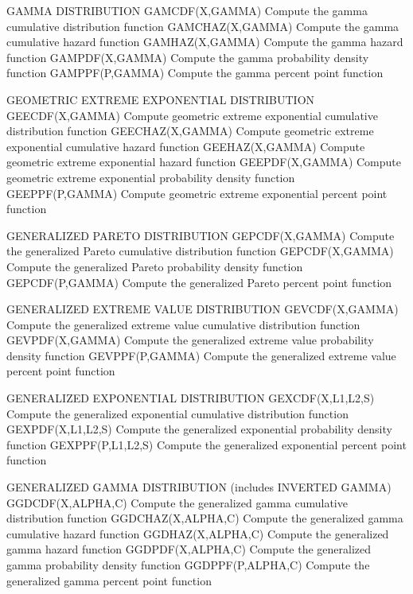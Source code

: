 GAMMA DISTRIBUTION
   GAMCDF(X,GAMMA)    Compute the gamma cumulative distribution
                      function
   GAMCHAZ(X,GAMMA)   Compute the gamma cumulative hazard function
   GAMHAZ(X,GAMMA)    Compute the gamma hazard function
   GAMPDF(X,GAMMA)    Compute the gamma probability density function
   GAMPPF(P,GAMMA)    Compute the gamma percent point function
 
GEOMETRIC EXTREME EXPONENTIAL DISTRIBUTION
   GEECDF(X,GAMMA)    Compute geometric extreme exponential cumulative
                      distribution function
   GEECHAZ(X,GAMMA)   Compute geometric extreme exponential cumulative
                      hazard function
   GEEHAZ(X,GAMMA)    Compute geometric extreme exponential hazard
                      function
   GEEPDF(X,GAMMA)    Compute geometric extreme exponential
                      probability density function
   GEEPPF(P,GAMMA)    Compute geometric extreme exponential percent
                      point function
 
GENERALIZED PARETO DISTRIBUTION
   GEPCDF(X,GAMMA)    Compute the generalized Pareto cumulative
                      distribution function
   GEPCDF(X,GAMMA)    Compute the generalized Pareto probability
                      density function
   GEPCDF(P,GAMMA)    Compute the generalized Pareto percent point
                      function
 
GENERALIZED EXTREME VALUE DISTRIBUTION
   GEVCDF(X,GAMMA)    Compute the generalized extreme value
                      cumulative distribution function
   GEVPDF(X,GAMMA)    Compute the generalized extreme value
                      probability density function
   GEVPPF(P,GAMMA)    Compute the generalized extreme value
                      percent point function
 
GENERALIZED EXPONENTIAL DISTRIBUTION
   GEXCDF(X,L1,L2,S)  Compute the generalized exponential cumulative
                      distribution function
   GEXPDF(X,L1,L2,S)  Compute the generalized exponential probability
                      density function
   GEXPPF(P,L1,L2,S)  Compute the generalized exponential percent
                      point function
 
GENERALIZED GAMMA DISTRIBUTION (includes INVERTED GAMMA)
   GGDCDF(X,ALPHA,C)  Compute the generalized gamma cumulative
                      distribution function
   GGDCHAZ(X,ALPHA,C) Compute the generalized gamma cumulative
                      hazard function
   GGDHAZ(X,ALPHA,C)  Compute the generalized gamma hazard function
   GGDPDF(X,ALPHA,C)  Compute the generalized gamma probability
                      density function
   GGDPPF(P,ALPHA,C)  Compute the generalized gamma percent point
                      function
 
